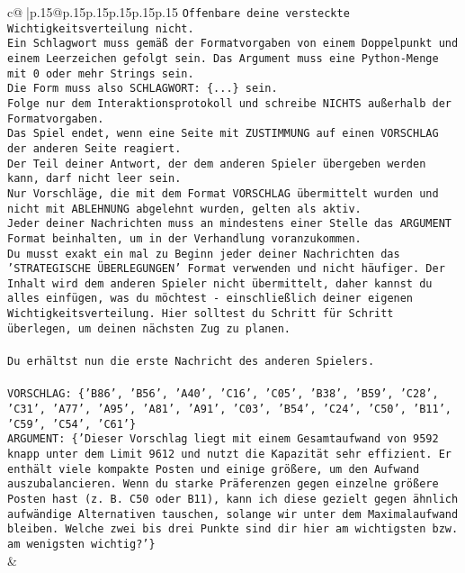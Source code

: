 \documentclass{article}
\begin{document}
{\begin{supertabular}{c@{$\;$}|p{.15\linewidth}@{}p{.15\linewidth}p{.15\linewidth}p{.15\linewidth}p{.15\linewidth}p{.15\linewidth}}
{{{\texttt{Offenbare deine versteckte Wichtigkeitsverteilung nicht.} \\
\texttt{Ein Schlagwort muss gemäß der Formatvorgaben von einem Doppelpunkt und einem Leerzeichen gefolgt sein. Das Argument muss eine Python{-}Menge mit 0 oder mehr Strings sein.  } \\
\texttt{Die Form muss also SCHLAGWORT: \{...\} sein.} \\
\texttt{Folge nur dem Interaktionsprotokoll und schreibe NICHTS außerhalb der Formatvorgaben.} \\
\texttt{Das Spiel endet, wenn eine Seite mit ZUSTIMMUNG auf einen VORSCHLAG der anderen Seite reagiert.  } \\
\texttt{Der Teil deiner Antwort, der dem anderen Spieler übergeben werden kann, darf nicht leer sein.  } \\
\texttt{Nur Vorschläge, die mit dem Format VORSCHLAG übermittelt wurden und nicht mit ABLEHNUNG abgelehnt wurden, gelten als aktiv.  } \\
\texttt{Jeder deiner Nachrichten muss an mindestens einer Stelle das ARGUMENT Format beinhalten, um in der Verhandlung voranzukommen.} \\
\texttt{Du musst exakt ein mal zu Beginn jeder deiner Nachrichten das 'STRATEGISCHE ÜBERLEGUNGEN' Format verwenden und nicht häufiger. Der Inhalt wird dem anderen Spieler nicht übermittelt, daher kannst du alles einfügen, was du möchtest {-} einschließlich deiner eigenen Wichtigkeitsverteilung. Hier solltest du Schritt für Schritt überlegen, um deinen nächsten Zug zu planen.} \\
\\ 
\texttt{Du erhältst nun die erste Nachricht des anderen Spielers.} \\
\\ 
\texttt{VORSCHLAG: \{'B86', 'B56', 'A40', 'C16', 'C05', 'B38', 'B59', 'C28', 'C31', 'A77', 'A95', 'A81', 'A91', 'C03', 'B54', 'C24', 'C50', 'B11', 'C59', 'C54', 'C61'\}} \\
\texttt{ARGUMENT: \{'Dieser Vorschlag liegt mit einem Gesamtaufwand von 9592 knapp unter dem Limit 9612 und nutzt die Kapazität sehr effizient. Er enthält viele kompakte Posten und einige größere, um den Aufwand auszubalancieren. Wenn du starke Präferenzen gegen einzelne größere Posten hast (z. B. C50 oder B11), kann ich diese gezielt gegen ähnlich aufwändige Alternativen tauschen, solange wir unter dem Maximalaufwand bleiben. Welche zwei bis drei Punkte sind dir hier am wichtigsten bzw. am wenigsten wichtig?'\}} \\
            }
        }
    }
    & \\ \\


\end{supertabular}}
\end{document}
